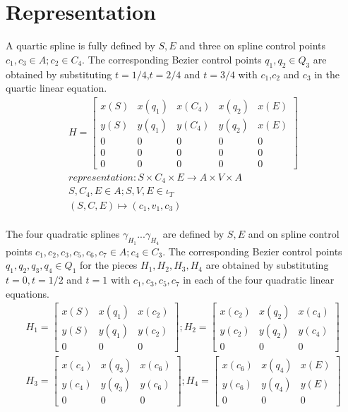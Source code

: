 \documentclass[a4paper,portrait]{report}
\begin{document}
\chapter{Representation}

A quartic spline is fully defined by $S,E$ and three on spline control points $c_{1},c_{3} \in A;c_{2} \in C_{4}$. The corresponding Bezier control points $q_{1},q_{2} \in Q_{3}$ are obtained by substituting $t=1/4$,$t=2/4$ and $t=3/4$ with $c_{1}$,$c_{2}$ and $c_{3}$ in the quartic linear equation.
\begin{align}
H=\begin{bmatrix}
x(S) & x(q_{1}) & x(C_{4}) & x(q_{2}) & x(E) \\
y(S) & y(q_{1}) & y(C_{4}) & y(q_{2}) & x(E) \\
0 & 0 & 0 & 0 & 0\\
0 & 0 & 0 & 0 & 0\\
0 & 0 & 0 & 0 & 0
\end{bmatrix}\\
representation: S \times C_{4} \times E \rightarrow A \times V \times A\\
S,C_{4},E \in A; S,V,E \in \iota_{T}\\
(S,C,E)\mapsto(c_{1},v_{1},c_{3})
\end{align}\\
The four quadratic splines $\gamma_{H_{1}} ... \gamma_{H_{4}}$ are defined by $S,E$ and on spline control points $c_{1},c_{2},c_{3},c_{5},c_{6},c_{7} \in A;c_{4} \in C_{3}$. The corresponding Bezier control points $q_{1},q_{2},q_{3},q_{4} \in Q_{1}$ for the pieces $H_{1},H_{2},H_{3},H_{4}$ are obtained by substituting $t=0,t=1/2$ and $t=1$ with $c_{1},c_{3},c_{5},c_{7}$ in each of the four quadratic linear equations.
\begin{align}
H_{1}=
\begin{bmatrix}
x(S) & x(q_{1}) & x(c_{2})\\
y(S) & y(q_{1}) & y(c_{2})\\
0 & 0 & 0
\end{bmatrix};
H_{2}=
\begin{bmatrix}
x(c_{2}) & x(q_{2}) & x(c_{4})\\
y(c_{2}) & y(q_{2}) & y(c_{4})\\
0 & 0 & 0
\end{bmatrix}\\
H_{3}=
\begin{bmatrix}
x(c_{4}) & x(q_{3}) & x(c_{6})\\
y(c_{4}) & y(q_{3}) & y(c_{6})\\
0 & 0 & 0
\end{bmatrix};
H_{4}=
\begin{bmatrix}
x(c_{6}) & x(q_{4}) & x(E)\\
y(c_{6}) & y(q_{4}) & y(E)\\
0 & 0 & 0
\end{bmatrix}
\end{align}
\end{document}
